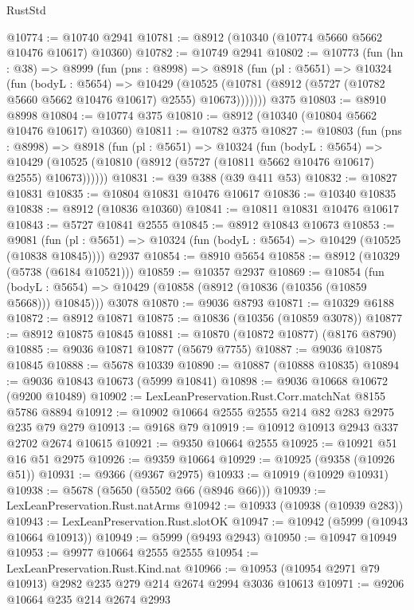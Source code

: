 \begin{lexlean}{RustStd}
\begin{coremodule}
@10774 := @10740 @2941
@10781 := @8912 (@10340 (@10774 @5660 @5662 @10476 @10617) @10360)
@10782 := @10749 @2941
@10802 := @10773
    (fun (hn : @38) =>
    @8999
      (fun (pns : @8998) =>
      @8918
        (fun (pl : @5651) =>
        @10324
          (fun (bodyL : @5654) =>
          @10429
            (@10525 (@10781 (@8912 (@5727 (@10782 @5660 @5662 @10476 @10617) @2555) @10673)))))))
    @375
@10803 := @8910 @8998
@10804 := @10774 @375
@10810 := @8912 (@10340 (@10804 @5662 @10476 @10617) @10360)
@10811 := @10782 @375
@10827 := @10803
    (fun (pns : @8998) =>
    @8918
      (fun (pl : @5651) =>
      @10324
        (fun (bodyL : @5654) =>
        @10429 (@10525 (@10810 (@8912 (@5727 (@10811 @5662 @10476 @10617) @2555) @10673))))))
@10831 := @39 @388 (@39 @411 @53)
@10832 := @10827 @10831
@10835 := @10804 @10831 @10476 @10617
@10836 := @10340 @10835
@10838 := @8912 (@10836 @10360)
@10841 := @10811 @10831 @10476 @10617
@10843 := @5727 @10841 @2555
@10845 := @8912 @10843 @10673
@10853 := @9081
    (fun (pl : @5651) => @10324 (fun (bodyL : @5654) => @10429 (@10525 (@10838 @10845))))
    @2937
@10854 := @8910 @5654
@10858 := @8912 (@10329 (@5738 (@6184 @10521)))
@10859 := @10357 @2937
@10869 := @10854
    (fun (bodyL : @5654) => @10429 (@10858 (@8912 (@10836 (@10356 (@10859 @5668))) @10845)))
    @3078
@10870 := @9036 @8793
@10871 := @10329 @6188
@10872 := @8912 @10871
@10875 := @10836 (@10356 (@10859 @3078))
@10877 := @8912 @10875 @10845
@10881 := @10870 (@10872 @10877) (@8176 @8790)
@10885 := @9036 @10871 @10877 (@5679 @7755)
@10887 := @9036 @10875 @10845
@10888 := @5678 @10339
@10890 := @10887 (@10888 @10835)
@10894 := @9036 @10843 @10673 (@5999 @10841)
@10898 := @9036 @10668 @10672 (@9200 @10489)
@10902 := LexLeanPreservation.Rust.Corr.matchNat @8155 @5786 @8894
@10912 := @10902 @10664 @2555 @2555 @214 @82 @283 @2975 @235 @79 @279
@10913 := @9168 @79
@10919 := @10912 @10913 @2943 @337 @2702 @2674 @10615
@10921 := @9350 @10664 @2555
@10925 := @10921 @51 @16 @51 @2975
@10926 := @9359 @10664
@10929 := @10925 (@9358 (@10926 @51))
@10931 := @9366 (@9367 @2975)
@10933 := @10919 (@10929 @10931)
@10938 := @5678 (@5650 (@5502 @66 (@8946 @66)))
@10939 := LexLeanPreservation.Rust.natArms
@10942 := @10933 (@10938 (@10939 @283))
@10943 := LexLeanPreservation.Rust.slotOK
@10947 := @10942 (@5999 (@10943 @10664 @10913))
@10949 := @5999 (@9493 @2943)
@10950 := @10947 @10949
@10953 := @9977 @10664 @2555 @2555
@10954 := LexLeanPreservation.Rust.Kind.nat
@10966 := @10953 (@10954 @2971 @79 @10913) @2982 @235 @279 @214 @2674 @2994 @3036 @10613
@10971 := @9206 @10664 @235 @214 @2674 @2993

\end{coremodule}
\end{lexlean}
